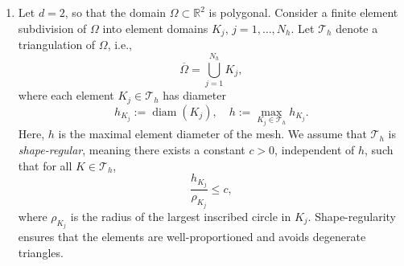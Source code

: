\begin{enumerate}[label=(\arabic*)]
\textit{Illustrative example:} 
Consider the bounded domain $\Omega = (0,1)$, and a subdivision into $N_h = 10$ finite element domains, each of size $h = 0.1$:
\begin{equation*}
    K_1 = [0,0.1], \quad K_2 = [0.1,0.2], \quad\ldots, \quad K_{10} = [0.9,1].
\end{equation*}
Let the non-overlapping subdomains be defined by grouping elements:
\begin{align*}
    \widetilde{\Omega}_1 &= \operatorname{int}(K_1 \cup K_2 \cup K_3) = (0,0.3),\\
    \widetilde{\Omega}_2 &= \operatorname{int}(K_4 \cup K_5 \cup K_6) = (0.3,0.6),\\
    \widetilde{\Omega}_3 &= \operatorname{int}(K_7 \cup K_8 \cup K_9 \cup K_{10}) = (0.6,1).
\end{align*}
If we choose $\delta = h$, that is, we extend each subdomain by one neighboring element on each side, then the overlapping subdomains become
\begin{align*}
    \Omega_1 &= \operatorname{int}(K_1 \cup K_2 \cup K_3 \cup K_4) = (0,0.4),\\
    \Omega_2 &= \operatorname{int}(K_3 \cup K_4 \cup K_5 \cup K_6 \cup K_7) = (0.2,0.7),\\
    \Omega_3 &= \operatorname{int}(K_6 \cup K_7 \cup K_8 \cup K_9 \cup K_{10}) = (0.5,1).
\end{align*}
Here, each $\Omega_i$ is an open interval consisting of all elements of the corresponding non-overlapping subdomain together with one neighboring element on each side (whenever available). The overlap, therefore, occurs only along full elements, ensuring that the decomposition respects the finite element mesh.
\item Let $d = 2$, so that the domain $\Omega \subset \mathbb{R}^{2}$ is polygonal. Consider a finite element subdivision of $\Omega$ into element domains $K_j$, $j = 1, \ldots, N_h$. Let $\mathcal{T}_h$ denote a triangulation of $\Omega$, i.e.,  
\begin{equation*}
    \overline{\Omega} = \bigcup_{j=1}^{N_h} K_j,
\end{equation*}  
where each element $K_j \in \mathcal{T}_h$ has diameter
\begin{equation*}
    h_{K_j} := \operatorname{diam}(K_j), \quad h := \max_{K_j \in \mathcal{T}_h} h_{K_j}.
\end{equation*}  
Here, $h$ is the maximal element diameter of the mesh. We assume that $\mathcal{T}_h$ is \emph{shape-regular}, meaning there exists a constant $c > 0$, independent of $h$, such that for all $K \in \mathcal{T}_h$,  
\begin{equation*}
    \frac{h_{K_{j}}}{\rho_{K_{j}}} \leq c,
\end{equation*}  
where $\rho_{K_{j}}$ is the radius of the largest inscribed circle in $K_{j}$. Shape-regularity ensures that the elements are well-proportioned and avoids degenerate triangles.  


\end{enumerate}
